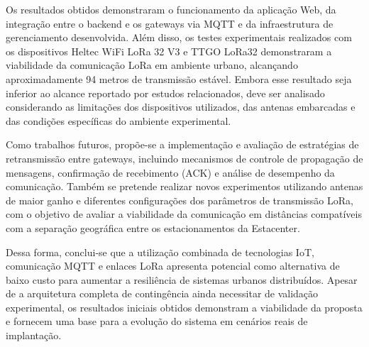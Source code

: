 \documentclass[
article,            %
11pt,               %
twoside,            %
a4paper,            %
section=TITLE,      %
onecolumn,          %
english,            %
brazil,             %
sumario=tradicional
]{abntex2}
\begin{document}
Os resultados obtidos demonstraram o funcionamento da aplicação Web, da integração entre o backend e os gateways via MQTT e da infraestrutura de gerenciamento desenvolvida. Além disso, os testes experimentais realizados com os dispositivos Heltec WiFi LoRa 32 V3 e TTGO LoRa32 demonstraram a viabilidade da comunicação LoRa em ambiente urbano, alcançando aproximadamente 94 metros de transmissão estável. Embora esse resultado seja inferior ao alcance reportado por estudos relacionados, deve ser analisado considerando as limitações dos dispositivos utilizados, das antenas embarcadas e das condições específicas do ambiente experimental.

Como trabalhos futuros, propõe-se a implementação e avaliação de estratégias de retransmissão entre gateways, incluindo mecanismos de controle de propagação de mensagens, confirmação de recebimento (ACK) e análise de desempenho da comunicação. Também se pretende realizar novos experimentos utilizando antenas de maior ganho e diferentes configurações dos parâmetros de transmissão LoRa, com o objetivo de avaliar a viabilidade da comunicação em distâncias compatíveis com a separação geográfica entre os estacionamentos da Estacenter.

Dessa forma, conclui-se que a utilização combinada de tecnologias IoT, comunicação MQTT e enlaces LoRa apresenta potencial como alternativa de baixo custo para aumentar a resiliência de sistemas urbanos distribuídos. Apesar de a arquitetura completa de contingência ainda necessitar de validação experimental, os resultados iniciais obtidos demonstram a viabilidade da proposta e fornecem uma base para a evolução do sistema em cenários reais de implantação.

\postextual

\end{document}
